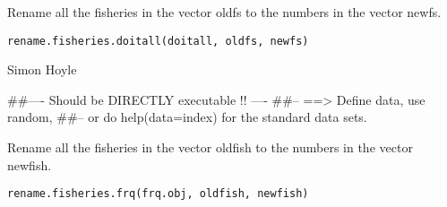 \documentclass[a4paper]{book}
\begin{document}
%
\begin{Description}\relax

Rename all the fisheries in the vector oldfs to the numbers in the vector newfs. 
\end{Description}
%
\begin{Usage}
\begin{verbatim}
rename.fisheries.doitall(doitall, oldfs, newfs)
\end{verbatim}
\end{Usage}
%
\begin{Arguments}
\begin{ldescription}
\item[\code{doitall}] 


\item[\code{oldfs}] 


\item[\code{newfs}] 


\end{ldescription}
\end{Arguments}
%
\begin{Author}\relax

Simon Hoyle
\end{Author}
%
\begin{Examples}
\begin{ExampleCode}
##---- Should be DIRECTLY executable !! ----
##-- ==>  Define data, use random,
##--	or do  help(data=index)  for the standard data sets.

\end{ExampleCode}
\end{Examples}
%
\begin{Description}\relax

Rename all the fisheries in the vector oldfish to the numbers in the vector newfish. 
\end{Description}
%
\begin{Usage}
\begin{verbatim}
rename.fisheries.frq(frq.obj, oldfish, newfish)
\end{verbatim}
\end{Usage}
%
\begin{Arguments}
\begin{ldescription}
\item[\code{frq.obj}] 


\item[\code{oldfish}] 


\item[\code{newfish}] 


\end{ldescription}
\end{Arguments}
\end{document}
